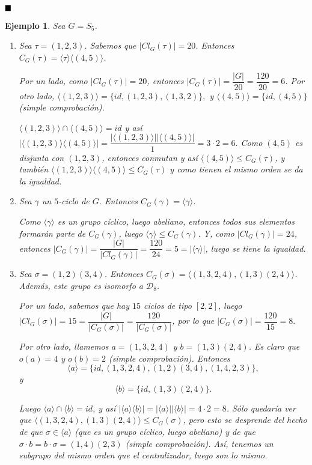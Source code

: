 \documentclass[12pt]{article}
\newtheorem{example}{Ejemplo}[theorem]
\begin{document}
$\hfill \blacksquare$

\begin{example}\label{eq:excentra} Sea $G = S_{5}$.
\begin{enumerate}
\item Sea $\tau = (1,2,3)$. Sabemos que $|Cl_{G}(\tau)| = 20$. Entonces $C_{G}(\tau) = \langle \tau \rangle \langle (4,5) \rangle$.

Por un lado, como $|Cl_{G}(\tau)| = 20$, entonces $|C_{G}(\tau)| = \dfrac{|G|}{20} = \dfrac{120}{20} = 6$. Por otro lado, $\langle (1,2,3) \rangle = \lbrace id, (1,2,3), (1,3,2) \rbrace,$ y $\langle (4,5)\rangle = \lbrace id, (4,5) \rbrace $ (simple comprobación). 

$\langle (1,2,3) \rangle \cap \langle (4,5) \rangle = id$ y así $|\langle (1,2,3) \rangle \langle (4,5) \rangle| = \dfrac{|\langle (1,2,3) \rangle||\langle (4,5) \rangle|}{1} = 3 \cdot 2 = 6.$ Como $(4,5)$ es disjunta con $(1,2,3)$, entonces conmutan y así $\langle (4,5) \rangle \leq C_{G}(\tau)$, y también $\langle (1,2,3) \rangle \langle (4,5) \rangle \leq C_{G}(\tau)$ y como tienen el mismo orden se da la igualdad.
\item Sea $\gamma$ un $5$-ciclo de $G$. Entonces $C_{G}(\gamma) = \langle \gamma \rangle$. 

Como $\langle \gamma \rangle$ es un grupo cíclico, luego abeliano, entonces todos sus elementos formarán parte de $C_{G}(\gamma)$, luego $\langle \gamma \rangle \leq C_{G}(\gamma)$. Y, como $|Cl_{G}(\gamma)| = 24$, entonces $|C_{G}(\gamma)| = \dfrac{|G|}{|Cl_{G}(\gamma)|} = \dfrac{120}{24} = 5 = |\langle \gamma \rangle |$, luego se tiene la igualdad. 
\item Sea $\sigma = (1,2)(3,4)$. Entonces $C_{G}(\sigma) = \langle (1,3,2,4),(1,3)(2,4)\rangle$. Además, este grupo es isomorfo a $\mathcal{D}_{8}$. 

Por un lado, sabemos que hay $15$ ciclos de tipo $[2,2]$, luego $|Cl_{G}(\sigma)|=15 = \dfrac{|G|}{|C_{G}(\sigma)|} = \dfrac{120}{|C_{G}(\sigma)|}$, por lo que $|C_{G}(\sigma)| = \dfrac{120}{15}=8.$

Por otro lado, llamemos $a = (1,3,2,4)$ y $b = (1,3)(2,4)$. Es claro que $o(a) = 4$ y $o(b)=2$ (simple comprobación). Entonces $$\langle a \rangle = \lbrace id, (1,3,2,4), (1,2)(3,4), (1,4,2,3) \rbrace,$$ y $$\langle b \rangle = \lbrace id, (1,3)(2,4) \rbrace.$$

Luego $\langle a \rangle \cap \langle b \rangle = id$, y así $|\langle a \rangle \langle b \rangle | = |\langle a \rangle| |\langle b \rangle| = 4\cdot 2 = 8$. Sólo quedaría ver que $\langle (1,3,2,4),(1,3)(2,4)\rangle \leq C_{G}(\sigma)$, pero esto se desprende del hecho de que $\sigma \in \langle a \rangle$ (que es un grupo cíclico, luego abeliano) y de que $\sigma \cdot b = b \cdot \sigma = (1,4)(2,3)$ (simple comprobación). Así, tenemos un subgrupo del mismo orden que el centralizador, luego son lo mismo.
\end{enumerate}
\end{example}
\end{document}
